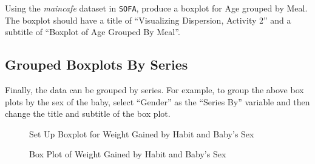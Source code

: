 Using the \textit{maincafe} dataset in \texttt{SOFA}, produce a boxplot for Age grouped by Meal. The boxplot should have a title of ``Visualizing Dispersion, Activity 2'' and a subtitle of ``Boxplot of Age Grouped By Meal''.

\subsection{Grouped Boxplots By Series}

Finally, the data can be grouped by series. For example, to group the above box plots by the sex of the baby, select ``Gender'' as the ``Series By'' variable and then change the title and subtitle of the box plot. 

\begin{figure}[H]
  \begin{center}
    \caption{Set Up Boxplot for Weight Gained by Habit and Baby's Sex}
  \end{center}
\end{figure}

\begin{figure}[H]
  \begin{center}
    \caption{Box Plot of Weight Gained by Habit and Baby's Sex}
    \label{vdi:img10}
  \end{center}
\end{figure}

